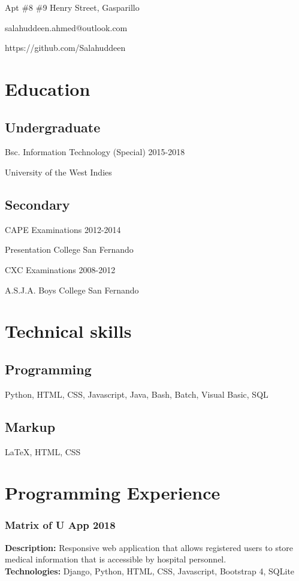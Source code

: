 \documentclass{article}
\makeatletter
\renewcommand{\maketitle}{
\begin{center}
{\huge\bfseries
\theauthor}
\vspace{.25em}

Apt \#8 \#9 Henry Street, Gasparillo

salahuddeen.ahmed@outlook.com

https://github.com/Salahuddeen


\end{center}
}
\makeatother
\begin{document}
\author{Salahuddeen Ahmed}

\maketitle

\section {Education}
\subsection{Undergraduate}
Bsc. Information Technology (Special) \hfill{2015-2018}

\hspace{10mm}University of the West Indies

\subsection{Secondary}
CAPE Examinations \hfill {2012-2014}

\hspace{10mm} Presentation College San Fernando

CXC Examinations \hfill {2008-2012}

\hspace{10mm}A.S.J.A. Boys College San Fernando
\section{Technical skills}

\subsection{Programming}
Python, HTML, CSS, Javascript, Java, Bash, Batch, Visual Basic, SQL

\subsection{Markup}
{\LaTeX}, HTML, CSS

\section{Programming Experience}

\subsubsection{Matrix of U App \hfill{2018}} 
{\bfseries Description:} Responsive web application that allows registered users to store medical information that is accessible by hospital personnel.
\\{\bfseries Technologies:} Django, Python, HTML, CSS, Javascript, Bootstrap 4, SQLite
\end{document}
